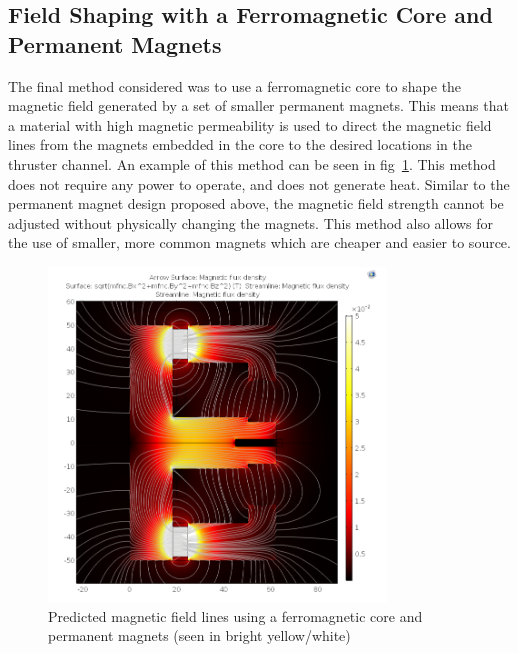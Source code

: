 \subsection{Field Shaping with a Ferromagnetic Core and Permanent Magnets}
The final method considered was to use a ferromagnetic core to shape the magnetic field generated by a set of smaller permanent magnets. This means that a material with high magnetic permeability is used to direct the magnetic field lines from the magnets embedded in the core to the desired locations in the thruster channel. An example of this method can be seen in fig~\ref{fig:ugrad-het-magnetic-shunt}. This method does not require any power to operate, and does not generate heat. Similar to the permanent magnet design proposed above, the magnetic field strength cannot be adjusted without physically changing the magnets. This method also allows for the use of smaller, more common magnets which are cheaper and easier to source.\\

\begin{figure}[H]
    \centering
    \includegraphics[width=0.8\textwidth]{images/Concepts/UGRAD magnetic shunt.png}
    \captionsetup{justification=centering}
    \caption{Predicted magnetic field lines using a ferromagnetic core and permanent magnets (seen in bright yellow/white) \cite{ugrad-het-olin-college}}
    \label{fig:ugrad-het-magnetic-shunt}
\end{figure}
